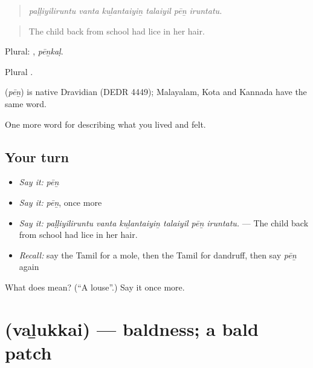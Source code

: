 \begin{quote}
\emph{paḷḷiyiliruntu vanta kuḻantaiyiṉ talaiyil pēṉ iruntatu.}
\end{quote}

\begin{quote}
The child back from school had lice in her hair.
\end{quote}

Plural: , \emph{pēṉkaḷ}.

Plural .

\begin{cousinweb}
\textbf{} (\emph{pēṉ}) is native Dravidian (DEDR 4449); Malayalam, Kota and Kannada have the same word.
\end{cousinweb}

\begin{grammarlens}[title={What you've built}]
One more word for describing what you lived and felt.
\end{grammarlens}

\subsection*{Your turn}
\begin{itemize}
\raggedright
  \item \emph{Say it:} \emph{pēṉ}
  \item \emph{Say it:} \emph{pēṉ}, once more
  \item \emph{Say it:} \emph{paḷḷiyiliruntu vanta kuḻantaiyiṉ talaiyil pēṉ iruntatu.} — The child back from school had lice in her hair.
  \item \emph{Recall:} say the Tamil for a mole, then the Tamil for dandruff, then say \emph{pēṉ} again
\end{itemize}

\begin{tcolorbox}[breakable,colback=teal!4,colframe=teal!35!black,title={Before you move on}]
What does  mean? (\textquotedblleft{}A louse\textquotedblright{}.) Say it once more.
\end{tcolorbox}
\section[\texorpdfstring{\ta{வழுக்கை} (vaḻukkai)}{வழுக்கை (vaḻukkai)}]{ (vaḻukkai) — baldness; a bald patch}

\label{lesson:TA-C484-valukkai}



